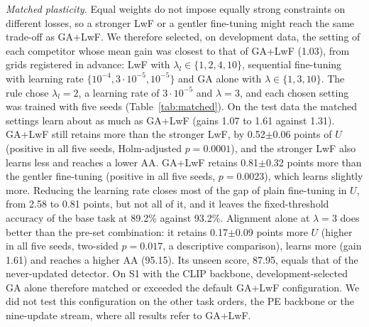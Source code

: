 \documentclass[journal]{IEEEtran}
\begin{document}
\textit{Matched plasticity.}\label{sec:matched} Equal weights do not impose equally strong constraints on different losses, so a stronger LwF or a gentler fine-tuning might reach the same trade-off as GA+LwF. We therefore selected, on development data, the setting of each competitor whose mean gain was closest to that of GA+LwF (1.03), from grids registered in advance: LwF with $\lambda_l\in\{1,2,4,10\}$, sequential fine-tuning with learning rate $\{10^{-4},3{\cdot}10^{-5},10^{-5}\}$ and GA alone with $\lambda\in\{1,3,10\}$. The rule chose $\lambda_l=2$, a learning rate of $3{\cdot}10^{-5}$ and $\lambda=3$, and each chosen setting was trained with five seeds (Table~\ref{tab:matched}). On the test data the matched settings learn about as much as GA+LwF (gains 1.07 to 1.61 against 1.31). GA+LwF still retains more than the stronger LwF, by 0.52$\pm$0.06 points of $U$ (positive in all five seeds, Holm-adjusted $p=0.0001$), and the stronger LwF also learns less and reaches a lower AA. GA+LwF retains 0.81$\pm$0.32 points more than the gentler fine-tuning (positive in all five seeds, $p=0.0023$), which learns slightly more. Reducing the learning rate closes most of the gap of plain fine-tuning in $U$, from 2.58 to 0.81 points, but not all of it, and it leaves the fixed-threshold accuracy of the base task at 89.2\% against 93.2\%. Alignment alone at $\lambda=3$ does better than the pre-set combination: it retains 0.17$\pm$0.09 points more $U$ (higher in all five seeds, two-sided $p=0.017$, a descriptive comparison), learns more (gain 1.61) and reaches a higher AA (95.15). Its unseen score, 87.95, equals that of the never-updated detector. On S1 with the CLIP backbone, development-selected GA alone therefore matched or exceeded the default GA+LwF configuration. We did not test this configuration on the other task orders, the PE backbone or the nine-update stream, where all results refer to GA+LwF.
\end{document}
